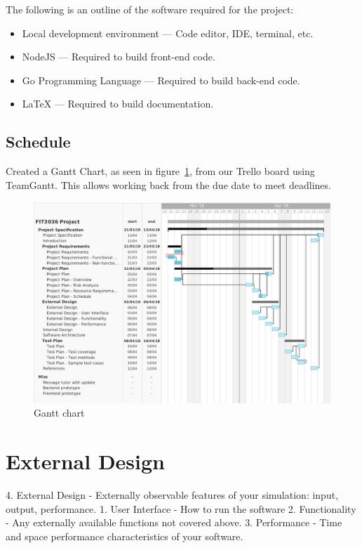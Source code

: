 \documentclass[a4paper,11pt]{article}
\begin{document}
The following is an outline of the software required for the project:

\begin{itemize}
  \item Local development environment --- Code editor, IDE, terminal, etc.
  \item NodeJS --- Required to build front-end code.
  \item Go Programming Language --- Required to build back-end code.
  \item \LaTeX{} --- Required to build documentation.
\end{itemize}

\subsection{Schedule}

Created a Gantt Chart, as seen in figure~\ref{fig:gantt}, from our Trello board
using TeamGantt. This allows working back from the due date to meet deadlines.

\begin{figure}[H]
  \includegraphics[width=\textwidth]{gantt-chart}
  \caption{Gantt chart}\label{fig:gantt}
\end{figure}

\section{External Design}


4. External Design - Externally observable features of your simulation: input, output, performance.
  1. User Interface - How to run the software
  2. Functionality - Any externally available functions not covered above.
  3. Performance - Time and space performance characteristics of your software.
\end{document}
